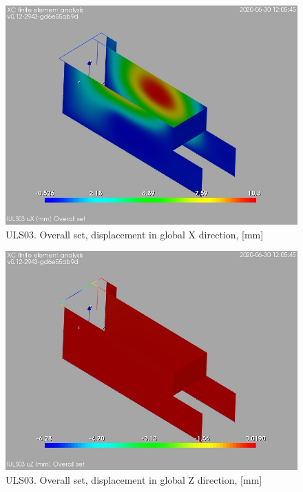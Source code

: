 \clearpage
\begin{figure}
\begin{center}
\includegraphics[width=\linewidth]{ramp_wall/resLC/text/graphics/resSimplLC/lULS03overallSetuX}
\caption{ULS03. Overall set, displacement in global X direction, [mm]}
\end{center}
\end{figure}
\begin{figure}
\begin{center}
\includegraphics[width=\linewidth]{ramp_wall/resLC/text/graphics/resSimplLC/lULS03overallSetuZ}
\caption{ULS03. Overall set, displacement in global Z direction, [mm]}
\end{center}
\end{figure}
